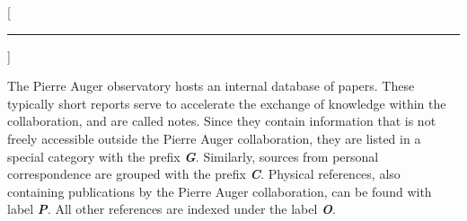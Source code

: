 
[\hrule\vspace{-0.5cm}]
\printbibheading

The Pierre Auger observatory hosts an internal database of papers. These 
typically short reports serve to accelerate the exchange of knowledge within the
collaboration, and are called \GAP notes. Since they contain information that is
not freely accessible outside the Pierre Auger collaboration, they are listed in
a special category with the prefix \textbf{\textit{G}}. Similarly, sources from 
personal correspondence are grouped with the prefix \textbf{\textit{C}}. 
Physical references, also containing publications by the Pierre Auger collaboration,
can be found with label \textbf{\textit{P}}. All other references are indexed under 
the label \textbf{\textit{O}}.

\newrefcontext[labelprefix=G]
\printbibliography[keyword={auger},title={GAP Notes},heading=subbibliography]

\newrefcontext[labelprefix=C]
\printbibliography[keyword={private},title={Personal Correspondence},heading=subbibliography]

\newrefcontext[labelprefix=P]
\printbibliography[keyword={phys},notkeyword={auger},title={Physics References},heading=subbibliography]

\newrefcontext[labelprefix=O]
\printbibliography[notkeyword={private},notkeyword={phys},notkeyword={auger},title={Other References},heading=subbibliography]

\cleardoublepage
